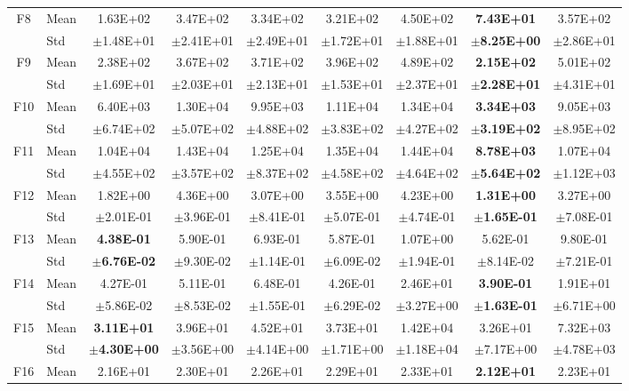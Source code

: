 \begin{table}[htbp]
{\begin{tabular}{clccccccc}
F8 & Mean & 1.63E+02 & 3.47E+02 & 3.34E+02 & 3.21E+02 & 4.50E+02 & \textbf{7.43E+01} & 3.57E+02 \\
 & Std & $\pm$1.48E+01 & $\pm$2.41E+01 & $\pm$2.49E+01 & $\pm$1.72E+01 & $\pm$1.88E+01 & $\pm$\textbf{8.25E+00} & $\pm$2.86E+01 \\
F9 & Mean & 2.38E+02 & 3.67E+02 & 3.71E+02 & 3.96E+02 & 4.89E+02 & \textbf{2.15E+02} & 5.01E+02 \\
 & Std & $\pm$1.69E+01 & $\pm$2.03E+01 & $\pm$2.13E+01 & $\pm$1.53E+01 & $\pm$2.37E+01 & $\pm$\textbf{2.28E+01} & $\pm$4.31E+01 \\
F10 & Mean & 6.40E+03 & 1.30E+04 & 9.95E+03 & 1.11E+04 & 1.34E+04 & \textbf{3.34E+03} & 9.05E+03 \\
 & Std & $\pm$6.74E+02 & $\pm$5.07E+02 & $\pm$4.88E+02 & $\pm$3.83E+02 & $\pm$4.27E+02 & $\pm$\textbf{3.19E+02} & $\pm$8.95E+02 \\
F11 & Mean & 1.04E+04 & 1.43E+04 & 1.25E+04 & 1.35E+04 & 1.44E+04 & \textbf{8.78E+03} & 1.07E+04 \\
 & Std & $\pm$4.55E+02 & $\pm$3.57E+02 & $\pm$8.37E+02 & $\pm$4.58E+02 & $\pm$4.64E+02 & $\pm$\textbf{5.64E+02} & $\pm$1.12E+03 \\
F12 & Mean & 1.82E+00 & 4.36E+00 & 3.07E+00 & 3.55E+00 & 4.23E+00 & \textbf{1.31E+00} & 3.27E+00 \\
 & Std & $\pm$2.01E-01 & $\pm$3.96E-01 & $\pm$8.41E-01 & $\pm$5.07E-01 & $\pm$4.74E-01 & $\pm$\textbf{1.65E-01} & $\pm$7.08E-01 \\
F13 & Mean & \textbf{4.38E-01} & 5.90E-01 & 6.93E-01 & 5.87E-01 & 1.07E+00 & 5.62E-01 & 9.80E-01 \\
 & Std & $\pm$\textbf{6.76E-02} & $\pm$9.30E-02 & $\pm$1.14E-01 & $\pm$6.09E-02 & $\pm$1.94E-01 & $\pm$8.14E-02 & $\pm$7.21E-01 \\
F14 & Mean & 4.27E-01 & 5.11E-01 & 6.48E-01 & 4.26E-01 & 2.46E+01 & \textbf{3.90E-01} & 1.91E+01 \\
 & Std & $\pm$5.86E-02 & $\pm$8.53E-02 & $\pm$1.55E-01 & $\pm$6.29E-02 & $\pm$3.27E+00 & $\pm$\textbf{1.63E-01} & $\pm$6.71E+00 \\
F15 & Mean & \textbf{3.11E+01} & 3.96E+01 & 4.52E+01 & 3.73E+01 & 1.42E+04 & 3.26E+01 & 7.32E+03 \\
 & Std & $\pm$\textbf{4.30E+00} & $\pm$3.56E+00 & $\pm$4.14E+00 & $\pm$1.71E+00 & $\pm$1.18E+04 & $\pm$7.17E+00 & $\pm$4.78E+03 \\
F16 & Mean & 2.16E+01 & 2.30E+01 & 2.26E+01 & 2.29E+01 & 2.33E+01 & \textbf{2.12E+01} & 2.23E+01 \\

\end{tabular}}
\end{table}
